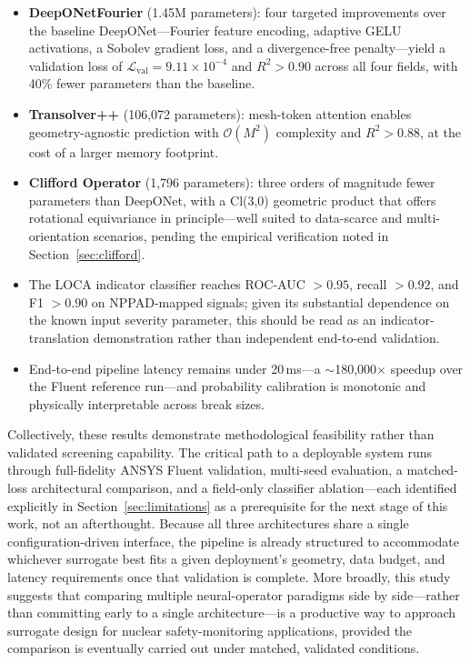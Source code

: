 \documentclass[journal]{IEEEtran}
\begin{document}
\begin{itemize}
    \item \textbf{DeepONetFourier} (1.45M parameters): four targeted improvements over the baseline DeepONet---Fourier feature encoding, adaptive GELU activations, a Sobolev gradient loss, and a divergence-free penalty---yield a validation loss of $\mathcal{L}_\text{val} = 9.11\times10^{-4}$ and $R^2 > 0.90$ across all four fields, with 40\% fewer parameters than the baseline.
    \item \textbf{Transolver++} (106,072 parameters): mesh-token attention enables geometry-agnostic prediction with $\mathcal{O}(M^2)$ complexity and $R^2 > 0.88$, at the cost of a larger memory footprint.
    \item \textbf{Clifford Operator} (1,796 parameters): three orders of magnitude fewer parameters than DeepONet, with a Cl(3,0) geometric product that offers rotational equivariance in principle---well suited to data-scarce and multi-orientation scenarios, pending the empirical verification noted in Section~\ref{sec:clifford}.
    \item The LOCA indicator classifier reaches ROC-AUC $> 0.95$, recall $> 0.92$, and F1 $> 0.90$ on NPPAD-mapped signals; given its substantial dependence on the known input severity parameter, this should be read as an indicator-translation demonstration rather than independent end-to-end validation.
    \item End-to-end pipeline latency remains under 20\,ms---a $\sim$180,000$\times$ speedup over the Fluent reference run---and probability calibration is monotonic and physically interpretable across break sizes.
\end{itemize}

Collectively, these results demonstrate methodological feasibility rather than validated screening capability. The critical path to a deployable system runs through full-fidelity ANSYS Fluent validation, multi-seed evaluation, a matched-loss architectural comparison, and a field-only classifier ablation---each identified explicitly in Section~\ref{sec:limitations} as a prerequisite for the next stage of this work, not an afterthought. Because all three architectures share a single configuration-driven interface, the pipeline is already structured to accommodate whichever surrogate best fits a given deployment's geometry, data budget, and latency requirements once that validation is complete. More broadly, this study suggests that comparing multiple neural-operator paradigms side by side---rather than committing early to a single architecture---is a productive way to approach surrogate design for nuclear safety-monitoring applications, provided the comparison is eventually carried out under matched, validated conditions.
\end{document}
